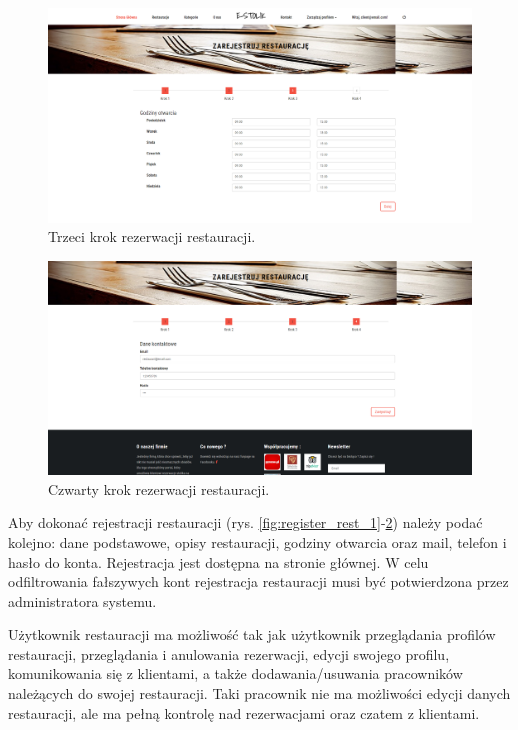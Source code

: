 \documentclass{article}
\begin{document}
\begin{figure}[H]
\centering
	\includegraphics[width=1.00\textwidth]{screens/register_rest_3.png}
	\caption[caption]{Trzeci krok rezerwacji restauracji.}
	\label{fig:register_rest_3}
\end{figure}

\begin{figure}[H]
\centering
	\includegraphics[width=1.00\textwidth]{screens/register_rest_4.png}
	\caption[caption]{Czwarty krok rezerwacji restauracji.}
	\label{fig:register_rest_4}
\end{figure}

Aby dokonać rejestracji restauracji (rys. \ref{fig:register_rest_1}-\ref{fig:register_rest_4}) należy podać kolejno: dane podstawowe, opisy restauracji, godziny otwarcia oraz mail, telefon i hasło do konta. Rejestracja jest dostępna na stronie głównej. W celu odfiltrowania fałszywych kont rejestracja restauracji musi być potwierdzona przez administratora systemu.


Użytkownik restauracji ma możliwość tak jak użytkownik przeglądania profilów restauracji, przeglądania i anulowania rezerwacji, edycji swojego profilu, komunikowania się z klientami, a także dodawania/usuwania pracowników należących do swojej restauracji. Taki pracownik nie ma możliwości edycji danych restauracji, ale ma pełną kontrolę nad rezerwacjami oraz czatem z klientami.
\end{document}
